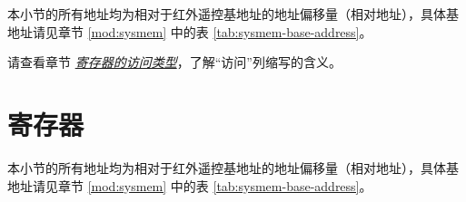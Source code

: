 \documentclass[main\_\_CN.tex]{subfiles}
\begin{document}
本小节的所有地址均为相对于红外遥控基地址的地址偏移量（相对地址），具体基地址请见章节 \ref{mod:sysmem} \textit{} 中的表 \ref{tab:sysmem-base-address}。

请查看章节 \hyperref[glossary-access-types]{\textit{寄存器的访问类型}}，了解“访问”列缩写的含义。






\newpage
\section{寄存器}

本小节的所有地址均为相对于红外遥控基地址的地址偏移量（相对地址），具体基地址请见章节 \ref{mod:sysmem} \textit{} 中的表 \ref{tab:sysmem-base-address}。


\end{document}

